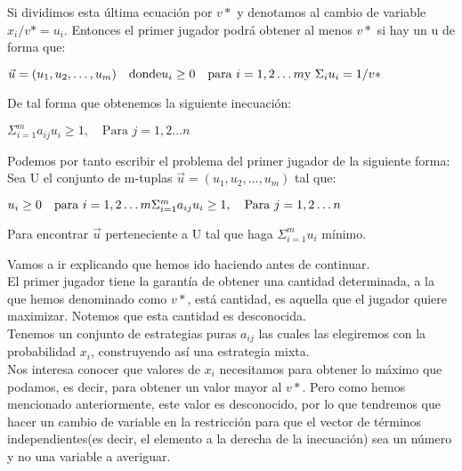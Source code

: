 \documentclass[10pt,a4paper]{book}
\begin{document}
Si dividimos esta última ecuación por $v*$ y denotamos al cambio de variable $x_i/v*=u_i$. Entonces el primer jugador podrá obtener al menos $v*$ si hay un u de forma que:\\

\begin{center}

$\vec{u}=(u_1,u_2, \ldots ,u_m) \quad \mbox{donde} \newline
u_i \geq 0 \quad \mbox{para } i=1,2 \ldots m \newline 
\mbox{y } \Sigma_i u_i=1/v*$

\end{center}

De tal forma que obtenemos la siguiente inecuación:\\

\begin{center}

$\Sigma^m_{i=1} a_{ij}u_i \geq 1, \quad \mbox{Para } j=1,2 \ldots n$

\end{center}

Podemos por tanto escribir el problema del primer jugador de la siguiente forma:\\

Sea U el conjunto de m-tuplas $\vec{u}=(u_1,u_2, \ldots ,u_m)$ tal que:\\

\begin{center}

$u_i \geq 0 \quad \mbox{para } i=1,2 \ldots m \newline 
\Sigma^m_{i=1} a_{ij}u_i \geq 1, \quad \mbox{Para } j=1,2 \ldots n$


\end{center}

Para encontrar $\vec{u}$ perteneciente a U tal que haga $\Sigma^m_{i=1}u_i$ mínimo.

Vamos a ir explicando que hemos ido haciendo antes de continuar. \\

El primer jugador tiene la garantía de obtener una cantidad determinada, a la que hemos denominado como $v*$, está cantidad, es aquella que el jugador quiere maximizar. Notemos que esta cantidad es desconocida.\\
Tenemos un conjunto de estrategias puras $a_{ij}$ las cuales las elegiremos con la probabilidad $x_i$, construyendo así una estrategia mixta.\\
Nos interesa conocer que valores de $x_i$ necesitamos para obtener lo máximo que podamos, es decir, para obtener un valor mayor al $v*$. Pero como hemos mencionado anteriormente, este valor es desconocido, por lo que tendremos que hacer un cambio de variable en la restricción para que el vector de términos independientes(es decir, el elemento a la derecha de la inecuación) sea un número y no una variable a averiguar.\\
\end{document}
